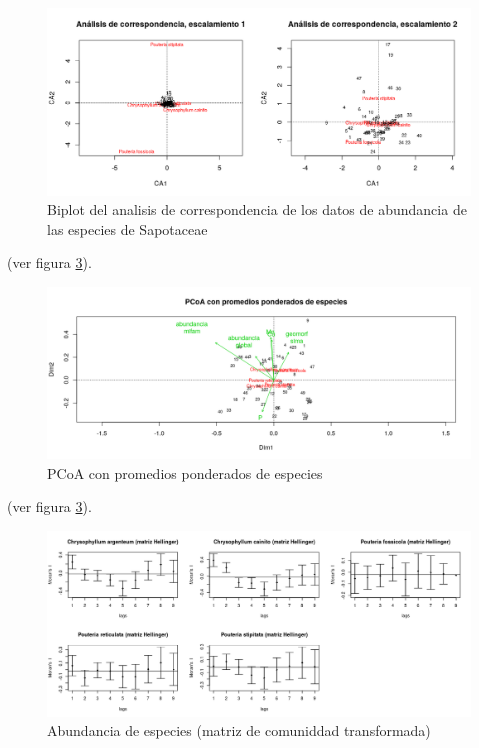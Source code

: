 \documentclass[11pt,]{article}
\begin{document}
\begin{figure}
\centering
\includegraphics[width=1.00000\textwidth]{analisis_de_correspondencia_actualizado.png}
\caption{Biplot del analisis de correspondencia de los datos de
abundancia de las especies de Sapotaceae
\label{fig:Analisis_de_correspondencia}}
\end{figure}

(ver figura \ref{fig:PCoA _promedios_especies}).

\begin{figure}
\centering
\includegraphics[width=1.00000\textwidth]{Promedios_ponderados.png}
\caption{PCoA con promedios ponderados de especies
\label{fig:PCoA _promedios_especies}}
\end{figure}

(ver figura \ref{fig:PCoA _promedios_especies}).

\begin{figure}
\centering
\includegraphics[width=1.00000\textwidth]{especies_ecologia_espacial.png}
\caption{Abundancia de especies (matriz de comuniddad transformada)
\label{fig:PCoA _promedios_especies}}
\end{figure}
\end{document}
